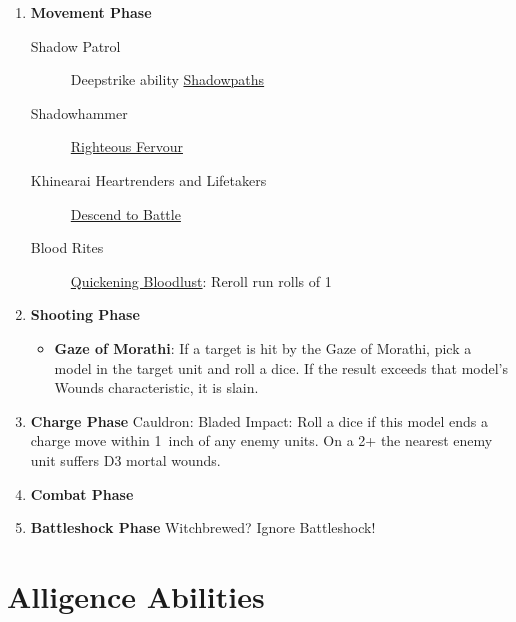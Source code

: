 \begin{enumerate}
\begin{description}[align=left]
    \end{description}

\item{\textbf{Movement Phase}}\hypertarget{movementphase}{}
\begin{description}
  \item [Shadow Patrol] Deepstrike ability \hyperref[shadowpaths]{Shadowpaths}
  \item [Shadowhammer] \hyperref[righteous-fervour]{Righteous Fervour}
  \item [Khinearai Heartrenders and Lifetakers] \hyperref[descend-to-battle]{Descend to Battle}
  \item [Blood Rites] \hyperref[quickening-bloodlust]{Quickening Bloodlust}:
      Reroll run rolls of 1
\end{description}


\item{\textbf{Shooting Phase}}\hypertarget{shootingphase}{}
\begin{itemize}
\tightlist
\item
  \textbf{Gaze of Morathi}: If a target is hit by the Gaze of Morathi,
  pick a model in the target unit and roll a dice. If the result exceeds
  that model's Wounds characteristic, it is slain. 
\end{itemize}

\item{\textbf{Charge Phase}}
Cauldron: Bladed Impact: Roll a dice if this model ends a charge move within 1~inch of any enemy units. On a 2+ the nearest enemy unit suffers D3 mortal wounds.

\item{\textbf{Combat Phase}}
\item{\textbf{Battleshock Phase}} Witchbrewed? Ignore Battleshock!
\end{enumerate}


\hypertarget{alligence-abilities}{%
    \section{Alligence Abilities}\label{alligence-abilities}}

